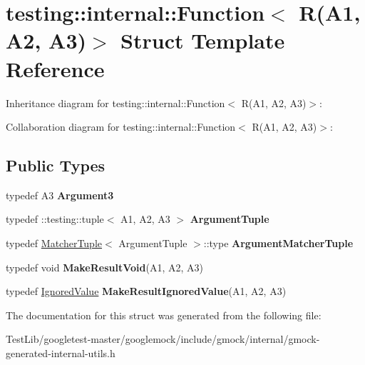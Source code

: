 \hypertarget{structtesting_1_1internal_1_1Function_3_01R_07A1_00_01A2_00_01A3_08_4}{}\section{testing\+:\+:internal\+:\+:Function$<$ R(A1, A2, A3)$>$ Struct Template Reference}
\label{structtesting_1_1internal_1_1Function_3_01R_07A1_00_01A2_00_01A3_08_4}


Inheritance diagram for testing\+:\+:internal\+:\+:Function$<$ R(A1, A2, A3)$>$\+:


Collaboration diagram for testing\+:\+:internal\+:\+:Function$<$ R(A1, A2, A3)$>$\+:
\subsection*{Public Types}
\begin{DoxyCompactItemize}
\item 
\mbox{\label{structtesting_1_1internal_1_1Function_3_01R_07A1_00_01A2_00_01A3_08_4_a2ac6eefb33feafe85c1c6742bdab509f}} 
typedef A3 {\bfseries Argument3}
\item 
\mbox{\label{structtesting_1_1internal_1_1Function_3_01R_07A1_00_01A2_00_01A3_08_4_a6f1e1097947a9e13a4e29099a61de804}} 
typedef \+::testing\+::tuple$<$ A1, A2, A3 $>$ {\bfseries Argument\+Tuple}
\item 
\mbox{\label{structtesting_1_1internal_1_1Function_3_01R_07A1_00_01A2_00_01A3_08_4_acb08fa0fffe1213ce88f53343bb3b564}} 
typedef \hyperlink{structtesting_1_1internal_1_1MatcherTuple}{Matcher\+Tuple}$<$ Argument\+Tuple $>$\+::type {\bfseries Argument\+Matcher\+Tuple}
\item 
\mbox{\label{structtesting_1_1internal_1_1Function_3_01R_07A1_00_01A2_00_01A3_08_4_a6b9f583a9ef6755cc92ce2b7fa255b84}} 
typedef void {\bfseries Make\+Result\+Void}(A1, A2, A3)
\item 
\mbox{\label{structtesting_1_1internal_1_1Function_3_01R_07A1_00_01A2_00_01A3_08_4_abff7468ae8231766e7b396c8a407cb5a}} 
typedef \hyperlink{classtesting_1_1internal_1_1IgnoredValue}{Ignored\+Value} {\bfseries Make\+Result\+Ignored\+Value}(A1, A2, A3)
\end{DoxyCompactItemize}


The documentation for this struct was generated from the following file\+:\begin{DoxyCompactItemize}
\item 
Test\+Lib/googletest-\/master/googlemock/include/gmock/internal/gmock-\/generated-\/internal-\/utils.\+h\end{DoxyCompactItemize}
